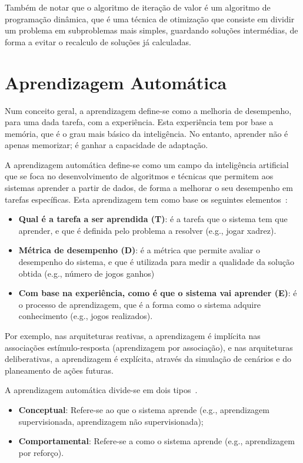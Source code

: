Também de notar que o algoritmo de iteração de valor é um algoritmo de programação dinâmica, que é uma técnica de otimização que consiste em dividir um problema em subproblemas mais simples, guardando soluções intermédias, de forma a evitar o recalculo de soluções já calculadas.


\section{Aprendizagem Automática}\label{sec:aprendizagem-automatica}

Num conceito geral, a aprendizagem define-se como a melhoria de desempenho, para uma dada tarefa, com a experiência.
Esta experiência tem por base a memória, que é o grau mais básico da inteligência. No entanto, aprender não é apenas memorizar; é ganhar a capacidade de adaptação.

A aprendizagem automática define-se como um campo da inteligência artificial que se foca no desenvolvimento de algoritmos e técnicas que permitem aos sistemas aprender a partir de dados, de forma a melhorar o seu desempenho em tarefas específicas.
Esta aprendizagem tem como base os seguintes elementos~\cite{isel:iasa:slides:aprendizagem-por-reforco}:

\begin{itemize}
    \item \textbf{Qual é a tarefa a ser aprendida (T)}: é a tarefa que o sistema tem que aprender, e que é definida pelo problema a resolver (e.g., jogar xadrez).
    \item \textbf{Métrica de desempenho (D)}: é a métrica que permite avaliar o desempenho do sistema, e que é utilizada para medir a qualidade da solução obtida (e.g., número de jogos ganhos)
    \item \textbf{Com base na experiência, como é que o sistema vai aprender (E)}: é o processo de aprendizagem, que é a forma como o sistema adquire conhecimento (e.g., jogos realizados).
\end{itemize}

Por exemplo, nas arquiteturas reativas, a aprendizagem é implícita nas associações estímulo-resposta (aprendizagem por associação), e nas arquiteturas deliberativas, a aprendizagem é explícita, através da simulação de cenários e do planeamento de ações futuras.

A aprendizagem automática divide-se em dois tipos~\cite{isel:iasa:slides:aprendizagem-por-reforco}.

\begin{itemize}
    \item \textbf{Conceptual}: Refere-se ao que o sistema aprende (e.g., aprendizagem supervisionada, aprendizagem não supervisionada);
    \item \textbf{Comportamental}: Refere-se a como o sistema aprende (e.g., aprendizagem por reforço).
\end{itemize}

